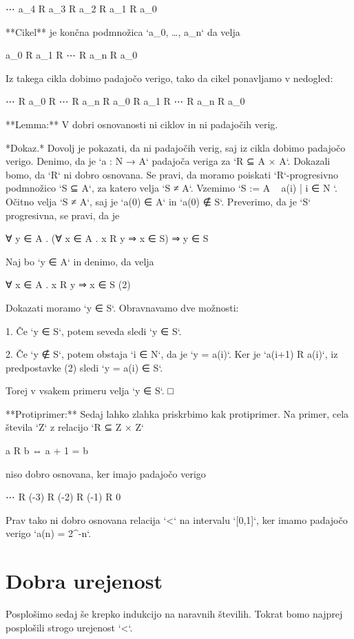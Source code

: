     ⋯ a_4 R a_3 R a_2 R a_1 R a_0

**Cikel** je končna podmnožica `{a_0, …, a_n}` da velja

     a_0 R a_1 R ⋯ R a_n R a_0

Iz takega cikla dobimo padajočo verigo, tako da cikel ponavljamo v nedogled:

     ⋯ R a_0 R ⋯ R a_n R a_0 R a_1 R ⋯ R a_n R a_0

**Lemma:** V dobri osnovanosti ni ciklov in ni padajočih verig.

*Dokaz.* Dovolj je pokazati, da ni padajočih verig, saj iz cikla dobimo padajočo verigo.
Denimo, da je `a : N → A` padajoča veriga za `R ⊆ A × A`. Dokazali bomo, da `R` ni dobro
osnovana. Se pravi, da moramo poiskati `R`-progresivno podmnožico `S ⊆ A`, za katero velja
`S ≠ A`. Vzemimo `S := A \ { a(i) | i ∈ N }`. Očitno velja `S ≠ A`, saj je `a(0) ∈ A` in
`a(0) ∉ S`. Preverimo, da je `S` progresivna, se pravi, da je

    ∀ y ∈ A . (∀ x ∈ A . x R y ⇒ x ∈ S) ⇒ y ∈ S

Naj bo `y ∈ A` in denimo, da velja

    ∀ x ∈ A . x R y ⇒ x ∈ S                               (2)

Dokazati moramo `y ∈ S`. Obravnavamo dve možnosti:

1. Če `y ∈ S`, potem seveda sledi `y ∈ S`.

2. Če `y ∉ S`, potem obstaja `i ∈ N`, da je `y = a(i)`. Ker je `a(i+1) R a(i)`, iz
   predpostavke (2) sledi `y = a(i) ∈ S`.

Torej v vsakem primeru velja `y ∈ S`. □

**Protiprimer:** Sedaj lahko zlahka priskrbimo kak protiprimer. Na primer, cela števila
`Z` z relacijo `R ⊆ Z × Z`

    a R b ⇔ a + 1 = b

niso dobro osnovana, ker imajo padajočo verigo

    ⋯ R (-3) R (-2) R (-1) R 0

Prav tako ni dobro osnovana relacija `<` na intervalu `[0,1]`, ker imamo padajočo verigo
`a(n) = 2^{-n}`.


\section{Dobra urejenost}

Posplošimo sedaj še krepko indukcijo na naravnih številih. Tokrat bomo najprej posplošili
strogo urejenost `<`.

